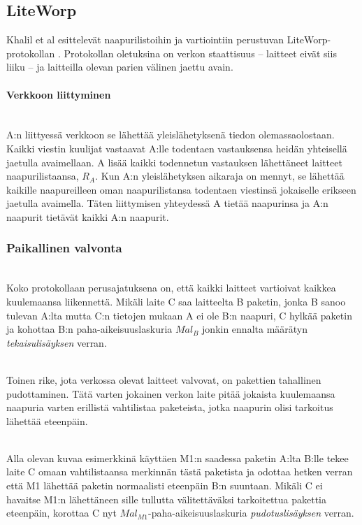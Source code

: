 \documentclass[finnish]{tktltiki2}
\theoremstyle{definition}
\theoremstyle{remark}
\begin{document}
% 
% 
% 
% 
% 
% 
% 
% 
% 
% 

\subsection{LiteWorp}
% 
% 
% 
% 
% 
% 
% 
% 
% 
% 
% 
% 

Khalil et al esittelevät naapurilistoihin ja vartiointiin perustuvan LiteWorp-protokollan \cite{liteworp}. Protokollan oletuksina on verkon staattisuus -- laitteet eivät siis liiku -- ja laitteilla olevan parien välinen jaettu avain.

\paragraph{Verkkoon liittyminen}
\noindent \\
A:n liittyessä verkkoon se lähettää yleislähetyksenä tiedon olemassaolostaan. Kaikki viestin kuulijat vastaavat A:lle todentaen vastauksensa heidän yhteisellä jaetulla avaimellaan. A lisää kaikki todennetun vastauksen lähettäneet laitteet naapurilistaansa, $R_A$. Kun A:n yleislähetyksen aikaraja on mennyt, se lähettää kaikille naapureilleen oman naapurilistansa todentaen viestinsä jokaiselle erikseen jaetulla avaimella. Täten liittymisen yhteydessä A tietää naapurinsa ja A:n naapurit tietävät kaikki A:n naapurit.

\subsubsection{Paikallinen valvonta}
\noindent \\
Koko protokollaan perusajatuksena on, että kaikki laitteet vartioivat kaikkea kuulemaansa liikennettä. Mikäli laite C saa laitteelta B paketin, jonka B sanoo tulevan A:lta mutta C:n tietojen mukaan A ei ole B:n naapuri, C hylkää paketin ja kohottaa B:n paha-aikeisuuslaskuria $Mal_B$ jonkin ennalta määrätyn \emph{tekaisulisäyksen} verran.

\noindent \\
Toinen rike, jota verkossa olevat laitteet valvovat, on pakettien tahallinen pudottaminen. Tätä varten jokainen verkon laite pitää jokaista kuulemaansa naapuria varten erillistä vahtilistaa paketeista, jotka naapurin olisi tarkoitus lähettää eteenpäin. 

\noindent \\
Alla olevan kuvaa esimerkkinä käyttäen M1:n saadessa paketin A:lta B:lle tekee laite C omaan vahtilistaansa merkinnän tästä paketista ja odottaa hetken verran että M1 lähettää paketin normaalisti eteenpäin B:n suuntaan. Mikäli C ei havaitse M1:n lähettäneen sille tullutta välitettäväksi tarkoitettua pakettia eteenpäin, korottaa C nyt $Mal_{M1}$-paha-aikeisuuslaskuria \emph{pudotuslisäyksen} verran.
\end{document}
